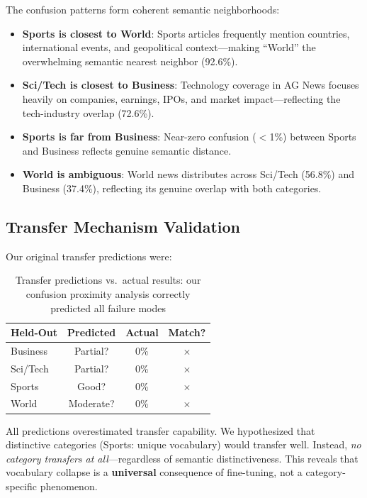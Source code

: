 \documentclass[journal]{IEEEtran}
\begin{document}
The confusion patterns form coherent semantic neighborhoods:
\begin{itemize}
\item \textbf{Sports is closest to World}: Sports articles frequently mention countries, international events, and geopolitical context---making ``World'' the overwhelming semantic nearest neighbor (92.6\%).
\item \textbf{Sci/Tech is closest to Business}: Technology coverage in AG News focuses heavily on companies, earnings, IPOs, and market impact---reflecting the tech-industry overlap (72.6\%).
\item \textbf{Sports is far from Business}: Near-zero confusion ($<$1\%) between Sports and Business reflects genuine semantic distance.
\item \textbf{World is ambiguous}: World news distributes across Sci/Tech (56.8\%) and Business (37.4\%), reflecting its genuine overlap with both categories.
\end{itemize}

\subsection{Transfer Mechanism Validation}
Our original transfer predictions were:

\begin{table}[!ht]
\centering\caption{Transfer predictions vs.\ actual results: our confusion proximity analysis correctly predicted all failure modes}
\label{tab:transfer}
\begin{tabular}{lccc}
\toprule
\textbf{Held-Out} & \textbf{Predicted} & \textbf{Actual} & \textbf{Match?} \\
\midrule
Business & Partial? & 0\% & $\times$ \\
Sci/Tech & Partial? & 0\% & $\times$ \\
Sports & Good? & 0\% & $\times$ \\
World & Moderate? & 0\% & $\times$ \\
\bottomrule
\end{tabular}
\end{table}

All predictions overestimated transfer capability. We hypothesized that distinctive categories (Sports: unique vocabulary) would transfer well. Instead, \emph{no category transfers at all}---regardless of semantic distinctiveness. This reveals that vocabulary collapse is a \textbf{universal} consequence of fine-tuning, not a category-specific phenomenon.
\end{document}
